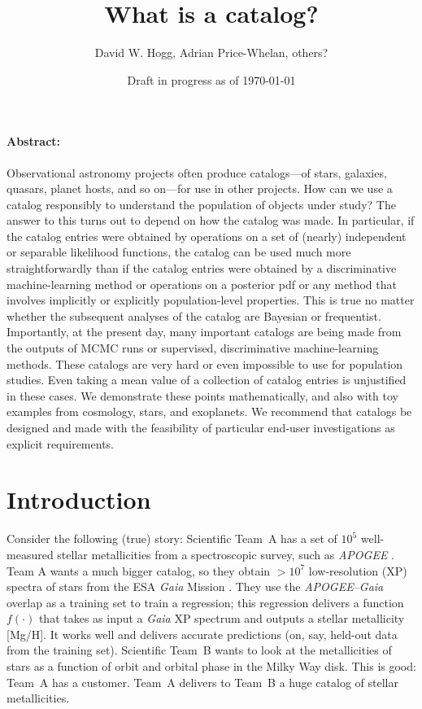 \documentclass[10pt]{article}
\title{\textbf{What is a catalog?}}
\author{David W. Hogg, Adrian Price-Whelan, others?}
\date{Draft in progress as of \today}
\begin{document}
\maketitle\thispagestyle{empty}

\paragraph{Abstract:}
    Observational astronomy projects often produce catalogs---of stars, galaxies, quasars, planet hosts, and so on---for use in other projects.
    How can we use a catalog responsibly to understand the population of objects under study?
    The answer to this turns out to depend on how the catalog was made.
    In particular, if the catalog entries were obtained by operations on a set of (nearly) independent or separable likelihood functions, the catalog can be used much more straightforwardly than if the catalog entries were obtained by a discriminative machine-learning method or operations on a posterior pdf or any method that involves implicitly or explicitly population-level properties.
    This is true no matter whether the subsequent analyses of the catalog are Bayesian or frequentist.
    Importantly, at the present day, many important catalogs are being made from the outputs of MCMC runs or supervised, discriminative machine-learning methods.
    These catalogs are very hard or even impossible to use for population studies.
    Even taking a mean value of a collection of catalog entries is unjustified in these cases.
    We demonstrate these points mathematically, and also with toy examples from cosmology, stars, and exoplanets.
    We recommend that catalogs be designed and made with the feasibility of particular end-user investigations as explicit requirements.

\section{Introduction}

Consider the following (true) story:
Scientific Team~A has a set of $10^5$ well-measured stellar metallicities from a spectroscopic survey, such as \textsl{APOGEE} \cite{apogee}.
Team A wants a much bigger catalog, so they obtain $>10^7$ low-resolution (XP) spectra of stars from the ESA \textsl{Gaia} Mission \cite{gaiadr3}.
They use the \textsl{APOGEE--Gaia} overlap as a training set to train a regression; this regression delivers a function $f(\cdot)$ that takes as input a \textsl{Gaia} XP spectrum and outputs a stellar metallicity [Mg/H].
It works well and delivers accurate predictions (on, say, held-out data from the training set).
Scientific Team~B wants to look at the metallicities of stars as a function of orbit and orbital phase in the Milky Way disk.
This is good: Team~A has a customer.
Team~A delivers to Team~B a huge catalog of stellar metallicities.
\end{document}

